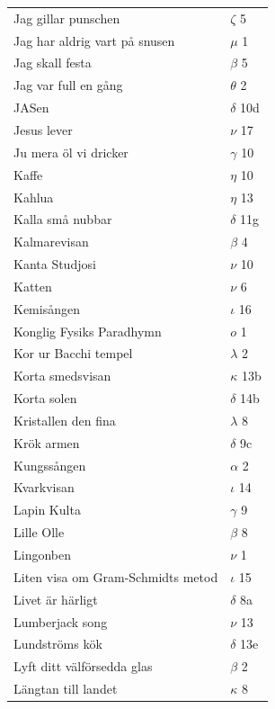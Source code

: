 \documentclass[a6paper,10pt]{article}
\begin{document}
\newpage
\begin{table}[!h]
\begin{tabular}{l l}
Jag gillar punschen&$\zeta$ 5\\
Jag har aldrig vart på snusen&$\mu$ 1\\
Jag skall festa&$\beta$ 5\\
Jag var full en gång&$\theta$ 2\\
JASen&$\delta$ 10d\\
Jesus lever&$\nu$ 17\\
Ju mera öl vi dricker&$\gamma$ 10\\
Kaffe&$\eta$ 10\\
Kahlua&$\eta$ 13\\
Kalla små nubbar&$\delta$ 11g\\
Kalmarevisan&$\beta$ 4\\
Kanta Studjosi&$\nu$ 10\\
Katten&$\nu$ 6\\
Kemisången&$\iota$ 16\\
Konglig Fysiks Paradhymn&$o$ 1\\
Kor ur Bacchi tempel	&$\lambda$ 2\\
Korta smedsvisan&	$\kappa$ 13b\\
Korta solen	&$\delta$ 14b\\
Kristallen den fina&	$\lambda$ 8\\
Krök armen	&$\delta$ 9c\\
Kungssången&	$\alpha$ 2\\
Kvarkvisan	&$\iota$ 14\\
Lapin Kulta&$\gamma$ 9\\
Lille Olle	&$\beta$ 8\\
Lingonben	&$\nu$ 1\\
Liten visa om Gram-Schmidts metod	&$\iota$ 15\\
Livet är härligt&	$\delta$ 8a\\
Lumberjack song	&$\nu$ 13\\
Lundströms kök	&$\delta$ 13e\\
Lyft ditt välförsedda glas&	$\beta$ 2\\
Längtan till landet&	$\kappa$ 8\\
\end{tabular}
\end{table}
\end{document}
